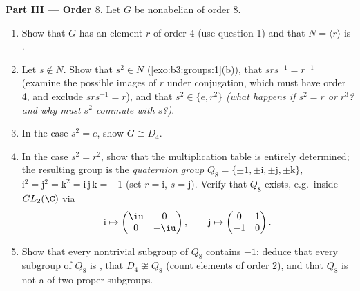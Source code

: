 \begin{problem}
\medskip
\noindent\textbf{Part III --- Order $8$.} Let $G$ be nonabelian of
order $8$.
\begin{enumerate}[resume]
  \item Show that $G$ has an element $r$ of order $4$ (use
        question 1) and that $N = \langle r\rangle$ is .
  \item Let $s \notin N$. Show that $s^2 \in N$
        (\cref{exo:b3:groups:1}(b)), that $srs^{-1} = r^{-1}$
        (examine the possible images of $r$ under conjugation,
        which must have order 4, and exclude $srs^{-1} = r$), and
        that $s^2 \in \{e, r^2\}$ \emph{(what happens if $s^2 = r$
        or $r^3$? and why must $s^2$ commute with $s$?)}.
  \item In the case $s^2 = e$, show $G \cong D_4$.
  \item In the case $s^2 = r^2$, show that the multiplication
        table is entirely determined; the resulting group is the
        \emph{quaternion group} $Q_8 =
        \{\pm 1, \pm \mathrm i, \pm \mathrm j, \pm \mathrm k\}$,
        $\mathrm i^2 = \mathrm j^2 = \mathrm k^2 = \mathrm i\,
        \mathrm j\,\mathrm k = -1$ (set $r = \mathrm i$, $s =
        \mathrm j$). Verify that $Q_8$ exists, e.g.\ inside
        $GL_2(\C)$ via
        \[
        \mathrm i \mapsto \begin{pmatrix} \iu & 0\\ 0 & -\iu
        \end{pmatrix},
        \qquad
        \mathrm j \mapsto \begin{pmatrix} 0 & 1\\ -1 & 0
        \end{pmatrix}.
        \]
  \item Show that every nontrivial subgroup of $Q_8$ contains
        $-1$; deduce that every subgroup of $Q_8$ is , that
        $D_4 \not\cong Q_8$ (count elements of order $2$), and
        that $Q_8$ is not a  of two proper
        subgroups.
\end{enumerate}


\end{problem}
